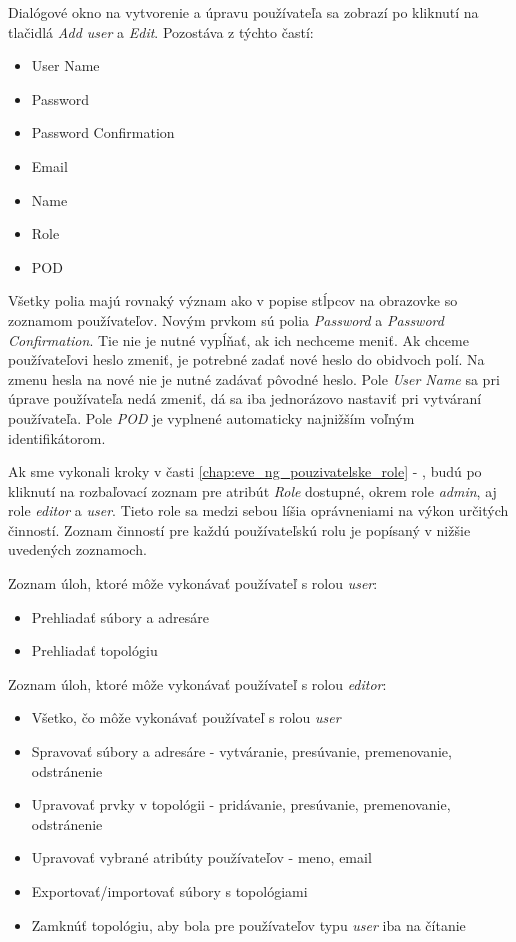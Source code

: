 Dialógové okno na vytvorenie a úpravu používateľa sa zobrazí po kliknutí na tlačidlá \emph{Add user} a \emph{Edit}. Pozostáva z týchto častí:

\begin{itemize}[noitemsep]
    \item User Name
    \item Password
    \item Password Confirmation
    \item Email
    \item Name
    \item Role
    \item POD
\end{itemize}

Všetky polia majú rovnaký význam ako v popise stĺpcov na obrazovke so zoznamom používateľov. Novým prvkom sú polia \emph{Password} a \emph{Password Confirmation}. Tie nie je nutné vypĺňať, ak ich nechceme meniť. Ak chceme používateľovi heslo zmeniť, je potrebné zadať nové heslo do obidvoch polí. Na zmenu hesla na nové nie je nutné zadávať pôvodné heslo. Pole \emph{User Name} sa pri úprave používateľa nedá zmeniť, dá sa iba jednorázovo nastaviť pri vytváraní používateľa. Pole \emph{POD} je vyplnené automaticky najnižším voľným identifikátorom.

Ak sme vykonali kroky v časti \ref{chap:eve_ng_pouzivatelske_role} - , budú po kliknutí na rozbaľovací zoznam pre atribút \emph{Role} dostupné, okrem role \emph{admin}, aj role \emph{editor} a \emph{user}. Tieto role sa medzi sebou líšia oprávneniami na výkon určitých činností. Zoznam činností pre každú používateľskú rolu je popísaný v nižšie uvedených zoznamoch.

\noindent
Zoznam úloh, ktoré môže vykonávať používateľ s rolou \emph{user}:

\begin{itemize}[noitemsep]
    \item Prehliadať súbory a adresáre
    \item Prehliadať topológiu
\end{itemize}

\noindent
Zoznam úloh, ktoré môže vykonávať používateľ s rolou \emph{editor}:

\begin{itemize}[noitemsep]
    \item Všetko, čo môže vykonávať používateľ s rolou \emph{user}
    \item Spravovať súbory a adresáre - vytváranie, presúvanie, premenovanie, odstránenie
    \item Upravovať prvky v topológii - pridávanie, presúvanie, premenovanie, odstránenie
    \item Upravovať vybrané atribúty používateľov - meno, email
    \item Exportovať/importovať súbory s topológiami
    \item Zamknúť topológiu, aby bola pre používateľov typu \emph{user} iba na čítanie
\end{itemize}

